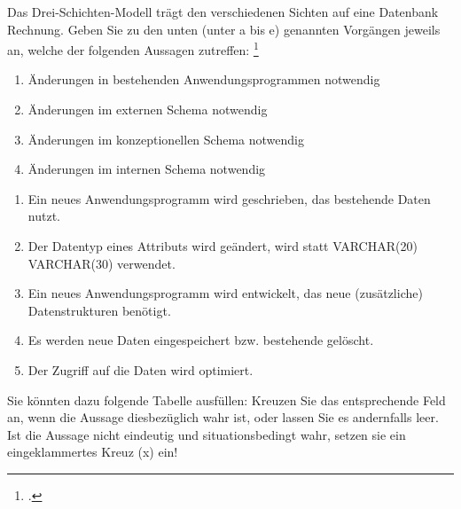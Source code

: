 \documentclass{bschlangaul-aufgabe}
\begin{document}

Das Drei-Schichten-Modell trägt den verschiedenen Sichten auf eine
Datenbank Rechnung. Geben Sie zu den unten (unter a bis e) genannten
Vorgängen jeweils an, welche
der folgenden Aussagen zutreffen:
\footcite{db:ab:klausurvorbereitung}

\begin{enumerate}
\item Änderungen in bestehenden Anwendungsprogrammen notwendig
\item Änderungen im externen Schema notwendig
\item Änderungen im konzeptionellen Schema notwendig
\item Änderungen im internen Schema notwendig
\end{enumerate}


\begin{enumerate}


\item Ein neues Anwendungsprogramm wird geschrieben, das bestehende
Daten nutzt.


\item Der Datentyp eines Attributs wird geändert, \zB wird statt
VARCHAR(20) VARCHAR(30) verwendet.


\item Ein neues Anwendungsprogramm wird entwickelt, das neue
(zusätzliche) Datenstrukturen benötigt.


\item Es werden neue Daten eingespeichert bzw. bestehende gelöscht.


\item Der Zugriff auf die Daten wird optimiert.
\end{enumerate}

\noindent
Sie könnten dazu folgende Tabelle ausfüllen: Kreuzen Sie das
entsprechende Feld an, wenn die Aussage diesbezüglich wahr ist, oder
lassen Sie es andernfalls leer. Ist die Aussage nicht eindeutig und
situationsbedingt wahr, setzen sie ein eingeklammertes Kreuz (x) ein!
\end{document}
